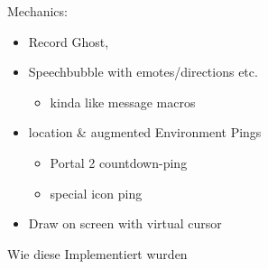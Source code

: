 Mechanics: 
\begin{itemize}
\item Record Ghost, 
\item Speechbubble with emotes/directions etc.
\begin{itemize}
\item kinda like message macros
\end{itemize}
\item location & augmented Environment Pings
\begin{itemize}
\item Portal 2 countdown-ping
\item special icon ping
\end{itemize}
\item Draw on screen with virtual cursor
\end{itemize}

Wie diese Implementiert wurden
